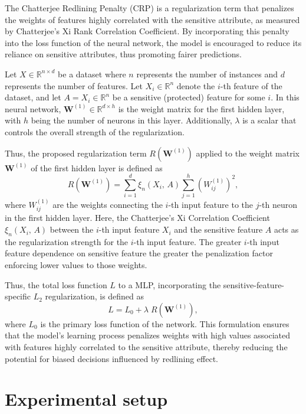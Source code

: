 The Chatterjee Redlining Penalty (CRP) is a regularization term that penalizes the weights of features highly correlated with the sensitive attribute, as measured by Chatterjee's Xi Rank Correlation Coefficient. By incorporating this penalty into the loss function of the neural network, the model is encouraged to reduce its reliance on sensitive attributes, thus promoting fairer predictions.

Let $X \in \mathbb{R}^{n \times d}$ be a dataset where $n$ represents the number of instances and $d$ represents the number of features. Let $X_i \in \mathbb{R}^n$ denote the $i$-th feature of the dataset, and let $A = X_i \in \mathbb{R}^n$ be a sensitive (protected) feature for some $i$. In this neural network, $\mathbf{W}^{(1)} \in \mathbb{R}^{d \times h}$ is the weight matrix for the first hidden layer, with $h$ being the number of neurons in this layer. Additionally, $\lambda$ is a scalar that controls the overall strength of the regularization.

Thus, the proposed regularization term $R(\mathbf{W}^{(1)})$ applied to the weight matrix $\mathbf{W}^{(1)}$ of the first hidden layer is defined as 
\begin{equation}\label{eq:xi_reg}
R(\mathbf{W}^{(1)}) = \sum_{i=1}^d \xi_n(X_i,\,A) \sum_{j=1}^h (W^{(1)}_{ij})^2,
\end{equation}
where $W^{(1)}_{ij}$ are the weights connecting the $i$-th input feature to the $j$-th neuron in the first hidden layer. Here, the Chatterjee's Xi Correlation Coefficient $\xi_n(X_i,\,A)$ between the $i$-th input feature $X_i$ and the sensitive feature $A$ acts as the regularization strength for the $i$-th input feature. The greater $i$-th input feature dependence on sensitive feature the greater the penalization factor enforcing lower values to those weights.

Thus, the total loss function $L$ to a MLP, incorporating the sensitive-feature-specific $L_2$ regularization, is defined as
\begin{equation}\label{eq:total_regularized_loss}
L = L_0 + \lambda \; R(\mathbf{W}^{(1)}),
\end{equation}
where $L_0$ is the primary loss function of the network. This formulation ensures that the model's learning process penalizes weights with high values associated with features highly correlated to the sensitive attribute, thereby reducing the potential for biased decisions influenced by redlining effect.

\section{Experimental setup}

